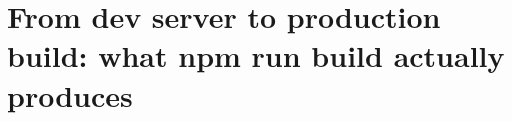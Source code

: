 \chapter{From dev server to production build: what npm run build actually produces}
\label{ch:from-dev-server-to-production-build}

